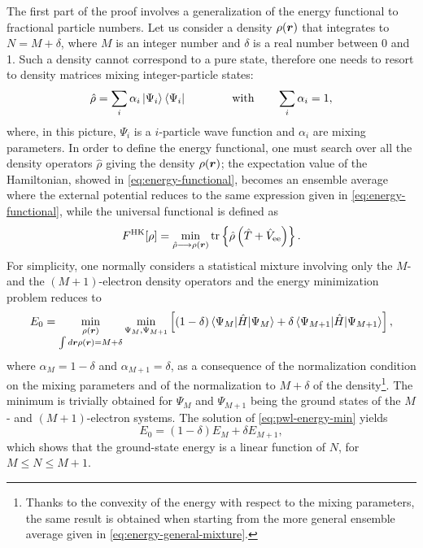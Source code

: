 The first part of the proof involves a generalization of the energy functional to fractional particle numbers. Let us consider a density $\rho({\bm r})$ that integrates to $N=M+\delta$, where $M$ is an integer number and $\delta$ is a real number between 0 and 1. Such a density cannot correspond to a pure state, therefore one needs to resort to density matrices mixing integer-particle states:
%
\begin{equation}
    \hat{\rho} = \sum_i \alpha_i \ket{\Psi_i}\bra{\Psi_i} \qquad \qquad \text{with} \qquad
    \sum_i \alpha_i = 1 ,
    \label{eq:mixed-state}
\end{equation}
%
where, in this picture, $\Psi_i$ is a $i$-particle wave function and $\alpha_i$ are mixing parameters. In order to define the energy functional, one must search over all the density operators $\hat{\rho}$ giving the density $\rho({\bm r})$; the expectation value of the Hamiltonian, showed in \cref{eq:energy-functional}, becomes an ensemble average where the external potential reduces to the same expression given in \cref{eq:energy-functional}, while the universal functional is defined as
%
\begin{equation}
    F^{\rm HK}[\rho] = \min_{\hat{\rho} \longrightarrow \rho({\bm r})} {\rm tr} \left\{ \hat{\rho} \left( \hat{T} + \hat{V}_{\rm ee} \right) \right\} .
    \label{eq:energy-general-mixture}
\end{equation}
%
For simplicity, one normally considers a statistical mixture involving only the $M$- and the $(M+1)$-electron density operators and the energy minimization problem reduces to
%
\begin{equation}
    E_0 = \min_{\substack{\rho({\bm r}) \\ \int d{\bm r} \rho({\bm r}) = M+\delta}} \min_{\Psi_M, \Psi_{M+1}}
    \left[ (1-\delta) \braket{\Psi_M|\hat{H}|\Psi_M} + \delta \braket{\Psi_{M+1}|\hat{H}|\Psi_{M+1}} \right] ,
    \label{eq:pwl-energy-min}
\end{equation}
%
where $\alpha_{M} = 1 - \delta$ and $\alpha_{M+1} = \delta$, as a consequence of the normalization condition on the mixing parameters and of the normalization to $M+\delta$ of the density\footnote{Thanks to the convexity of the energy with respect to the mixing parameters, the same result is obtained when starting from the more general ensemble average given in \cref{eq:energy-general-mixture}.}. The minimum is trivially obtained for $\Psi_M$ and $\Psi_{M+1}$ being the ground states of the $M$- and $(M+1)$-electron systems. The solution of \cref{eq:pwl-energy-min} yields
%
\begin{equation}
    E_0 = (1 - \delta) E_M + \delta E_{M+1} ,
    \label{eq:pwl-energy}
\end{equation}
%
which shows that the ground-state energy is a linear function of $N$, for $M \leq N \leq M+1$.

